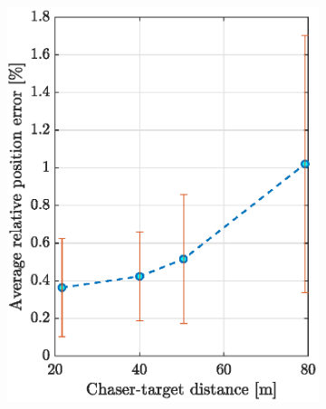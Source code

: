 \begin{figure}[!h]
    \begin{subfigure}{0.48\linewidth}
        \centering
        \includegraphics[width=\linewidth]{Images/DistPos.eps}
    \end{subfigure}\hfill
    \begin{subfigure}{0.48\linewidth}
        \centering

\end{subfigure}
\end{figure}
